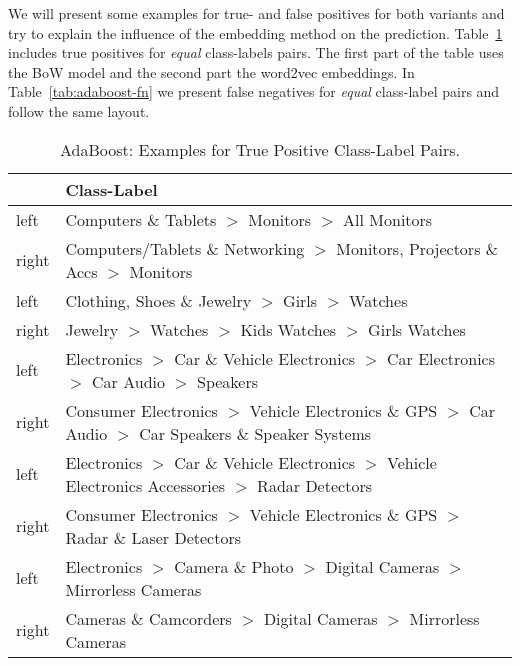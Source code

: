 We will present some examples for true- and false positives for both variants and try to explain the influence of the
embedding method on the prediction.
Table~\ref{tab:adaboost-tp} includes true positives for \emph{equal} class-labels pairs.
The first part of the table uses the BoW model and the second part the word2vec embeddings.
In Table~\ref{tab:adaboost-fn} we present false negatives for \emph{equal} class-label pairs and follow the same layout.
\begin{table}[htbp]
    \begin{center}
        \begin{tabularx}{\textwidth}{lX}
            & Class-Label \\
            \hline
            left & Computers \& Tablets $>$ Monitors $>$ All Monitors \\
            right & Computers/Tablets \& Networking $>$ Monitors, Projectors \& Accs $>$ Monitors \\
            \hline
            left & Clothing, Shoes \& Jewelry $>$ Girls $>$ Watches \\
            right & Jewelry $>$ Watches $>$ Kids Watches $>$ Girls Watches \\
            \hline
            left & Electronics $>$ Car \& Vehicle Electronics $>$ Car Electronics $>$ Car Audio $>$ Speakers \\
            right & Consumer Electronics $>$ Vehicle Electronics \& GPS $>$ Car Audio $>$ Car Speakers \& Speaker Systems \\
            \hline
            \hline
            left & Electronics $>$ Car \& Vehicle Electronics $>$ Vehicle Electronics Accessories $>$ Radar Detectors \\
            right & Consumer Electronics $>$ Vehicle Electronics \& GPS $>$ Radar \& Laser Detectors \\
            \hline
            left & Electronics $>$ Camera \& Photo $>$ Digital Cameras $>$ Mirrorless Cameras \\
            right & Cameras \& Camcorders $>$ Digital Cameras $>$ Mirrorless Cameras \\
        \end{tabularx}
        \caption{AdaBoost: Examples for True Positive Class-Label Pairs.}
        \label{tab:adaboost-tp}
    \end{center}
\end{table}

